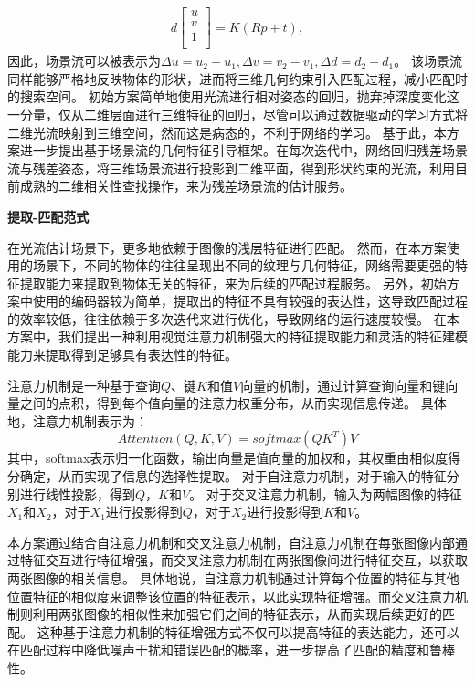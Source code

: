 \documentclass[12pt]{article}
\begin{document}
\begin{equation}
    \begin{aligned}
    d
    \begin{bmatrix}
    u \\
    v \\
    1 \\
    \end{bmatrix}
    =K(Rp+t),
    \end{aligned}
\end{equation}
因此，场景流可以被表示为$\Delta u = u_2 - u_1, \Delta v = v_2 - v_1, \Delta d = d_2 - d_1$。
该场景流同样能够严格地反映物体的形状，进而将三维几何约束引入匹配过程，减小匹配时的搜索空间。
初始方案简单地使用光流进行相对姿态的回归，抛弃掉深度变化这一分量，仅从二维层面进行三维特征的回归，尽管可以通过数据驱动的学习方式将二维光流映射到三维空间，然而这是病态的，不利于网络的学习。
基于此，本方案进一步提出基于场景流的几何特征引导框架。在每次迭代中，网络回归残差场景流与残差姿态，将三维场景流进行投影到二维平面，得到形状约束的光流，利用目前成熟的二维相关性查找操作，来为残差场景流的估计服务。






\textbf{提取-匹配范式}

在光流估计场景下，更多地依赖于图像的浅层特征进行匹配。
然而，在本方案使用的场景下，不同的物体的往往呈现出不同的纹理与几何特征，网络需要更强的特征提取能力来提取到物体无关的特征，来为后续的匹配过程服务。
另外，初始方案中使用的编码器较为简单，提取出的特征不具有较强的表达性，这导致匹配过程的效率较低，往往依赖于多次迭代来进行优化，导致网络的运行速度较慢。
在本方案中，我们提出一种利用视觉注意力机制强大的特征提取能力和灵活的特征建模能力来提取得到足够具有表达性的特征。


注意力机制是一种基于查询$Q$、键$K$和值$V$向量的机制，通过计算查询向量和键向量之间的点积，得到每个值向量的注意力权重分布，从而实现信息传递。
具体地，注意力机制表示为：
\begin{equation}
    Attention(Q, K, V) = softmax(QK^T)V
\end{equation}
其中，softmax表示归一化函数，输出向量是值向量的加权和，其权重由相似度得分确定，从而实现了信息的选择性提取。
对于自注意力机制，对于输入的特征分别进行线性投影，得到$Q$，$K$和$V$。
对于交叉注意力机制，输入为两幅图像的特征$X_1$和$X_2$，对于$X_1$进行投影得到$Q$，对于$X_2$进行投影得到$K$和$V$。

本方案通过结合自注意力机制和交叉注意力机制，自注意力机制在每张图像内部通过特征交互进行特征增强，而交叉注意力机制在两张图像间进行特征交互，以获取两张图像的相关信息。
具体地说，自注意力机制通过计算每个位置的特征与其他位置特征的相似度来调整该位置的特征表示，以此实现特征增强。而交叉注意力机制则利用两张图像的相似性来加强它们之间的特征表示，从而实现后续更好的匹配。
这种基于注意力机制的特征增强方式不仅可以提高特征的表达能力，还可以在匹配过程中降低噪声干扰和错误匹配的概率，进一步提高了匹配的精度和鲁棒性。
\end{document}
